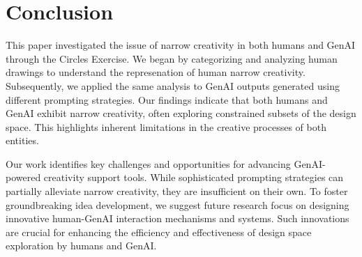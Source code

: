 \section{Conclusion}
This paper investigated the issue of narrow creativity in both humans and GenAI through the Circles Exercise. 
We began by categorizing and analyzing human drawings to understand the represenation of human narrow creativity. 
Subsequently, we applied the same analysis to GenAI outputs generated using different prompting strategies.
Our findings indicate that both humans and GenAI exhibit narrow creativity, often exploring constrained subsets of the design space. This highlights inherent limitations in the creative processes of both entities.

Our work identifies key challenges and opportunities for advancing GenAI-powered creativity support tools. While sophisticated prompting strategies can partially alleviate narrow creativity, they are insufficient on their own. 
To foster groundbreaking idea development, we suggest future research focus on designing innovative human-GenAI interaction mechanisms and systems. 
Such innovations are crucial for enhancing the efficiency and effectiveness of design space exploration by humans and GenAI.
